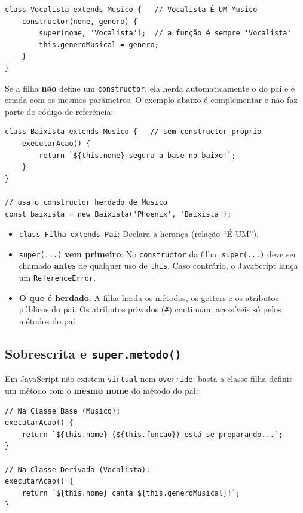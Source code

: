 \begin{lstlisting}[style=javascript]
class Vocalista extends Musico {   // Vocalista É UM Musico
    constructor(nome, genero) {
        super(nome, 'Vocalista');  // a função é sempre 'Vocalista'
        this.generoMusical = genero;
    }
}
\end{lstlisting}

Se a filha \textbf{não} define um \texttt{constructor}, ela herda automaticamente o do pai e é
criada com os mesmos parâmetros. O exemplo abaixo é complementar e não faz parte do código de
referência:

\begin{lstlisting}[style=javascript]
class Baixista extends Musico {   // sem constructor próprio
    executarAcao() {
        return `${this.nome} segura a base no baixo!`;
    }
}

// usa o constructor herdado de Musico
const baixista = new Baixista('Phoenix', 'Baixista');
\end{lstlisting}

\begin{itemize}
    \item \texttt{class Filha extends Pai}: Declara a herança (relação ``É UM'').

    \item \texttt{super(...)} \textbf{vem primeiro}: No \texttt{constructor} da filha,
    \texttt{super(...)} deve ser chamado \textbf{antes} de qualquer uso de \texttt{this}. Caso
    contrário, o JavaScript lança um \texttt{ReferenceError}.

    \item \textbf{O que é herdado}: A filha herda os métodos, os getters e os atributos públicos
    do pai. Os atributos privados (\texttt{\#}) continuam acessíveis só pelos métodos do pai.
\end{itemize}

\subsection{Sobrescrita e \texttt{super.metodo()}}

Em JavaScript não existem \texttt{virtual} nem \texttt{override}: basta a classe filha definir
um método com o \textbf{mesmo nome} do método do pai:

\begin{lstlisting}[style=javascript]
// Na Classe Base (Musico):
executarAcao() {
    return `${this.nome} (${this.funcao}) está se preparando...`;
}

// Na Classe Derivada (Vocalista):
executarAcao() {
    return `${this.nome} canta ${this.generoMusical}!`;
}
\end{lstlisting}

